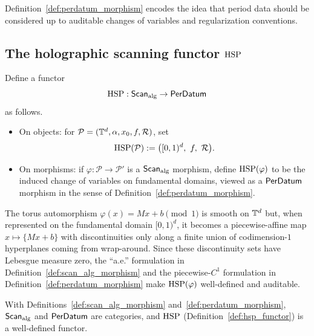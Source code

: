 Definition~\ref{def:perdatum_morphism} encodes the idea that period data should be considered up to auditable changes of variables and regularization conventions.

\subsection{The holographic scanning functor \texorpdfstring{$\mathrm{HSP}$}{HSP}}
\label{sec:hsp_functor}

\begin{definition}
\label{def:hsp_functor}
Define a functor
\begin{equation}
\label{eq:hsp_def}
\mathrm{HSP}:\mathsf{Scan}_{\mathrm{alg}}\to\mathsf{PerDatum}
\end{equation}
as follows.
\begin{itemize}
\item On objects: for $\mathcal{P}=(\mathbb{T}^d,\alpha,x_0,f,\mathcal{R})$, set
\begin{equation}
\label{eq:hsp_on_objects}
\HSP(\mathcal{P}) := \big([0,1)^d,\ f,\ \mathcal{R}\big).
\end{equation}
\item On morphisms: if $\varphi:\mathcal{P}\to\mathcal{P}'$ is a $\mathsf{Scan}_{\mathrm{alg}}$ morphism, define $\mathrm{HSP}(\varphi)$ to be the induced change of variables on fundamental domains, viewed as a $\mathsf{PerDatum}$ morphism in the sense of Definition~\ref{def:perdatum_morphism}.
\end{itemize}
\end{definition}

\begin{remark}
\label{rem:fundamental_domain_ae}
The torus automorphism $\varphi(x)=Mx+b\pmod{1}$ is smooth on $\mathbb{T}^d$ but, when represented on the fundamental domain $[0,1)^d$, it becomes a piecewise-affine map $x\mapsto \{Mx+b\}$ with discontinuities only along a finite union of codimension-$1$ hyperplanes coming from wrap-around. Since these discontinuity sets have Lebesgue measure zero, the ``a.e.'' formulation in Definition~\ref{def:scan_alg_morphism} and the piecewise-$C^1$ formulation in Definition~\ref{def:perdatum_morphism} make $\mathrm{HSP}(\varphi)$ well-defined and auditable.
\end{remark}

\begin{lemma}
\label{lem:category_and_functoriality}
With Definitions~\ref{def:scan_alg_morphism} and~\ref{def:perdatum_morphism}, $\mathsf{Scan}_{\mathrm{alg}}$ and $\mathsf{PerDatum}$ are categories, and $\mathrm{HSP}$ (Definition~\ref{def:hsp_functor}) is a well-defined functor.
\end{lemma}

